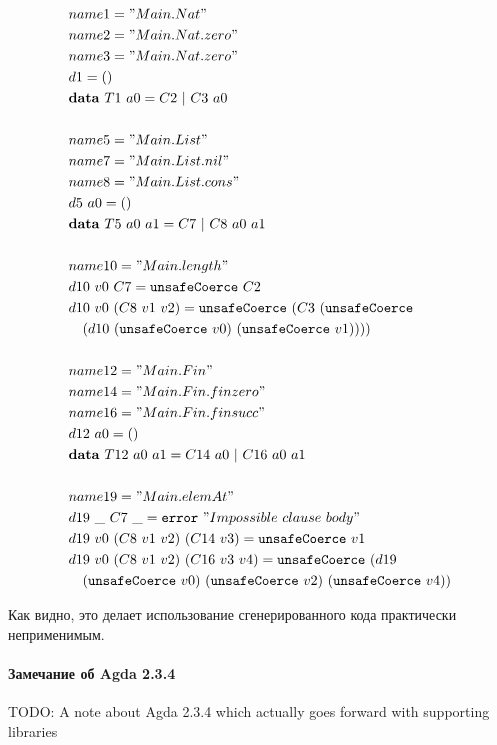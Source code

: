 \begin{align*}
&name1 = "Main.Nat"\\
&name2 = "Main.Nat.zero"\\
&name3 = "Main.Nat.zero"\\
&d1 = ()\\
&\mathbf{data}\ T1\ a0 = C2\ |\ C3\ a0\\
\\
&name5 = "Main.List"\\
&name7 = "Main.List.nil"\\
&name8 = "Main.List.cons"\\
&d5\ a0 = ()\\
&\mathbf{data}\ T5\ a0\ a1 = C7\ |\ C8\ a0\ a1\\
\\
&name10 = "Main.length"\\
&d10\ v0\ C7 = \texttt{unsafeCoerce}\ C2\\
&d10\ v0\ (C8\ v1\ v2) = \texttt{unsafeCoerce}\ (C3\ (\texttt{unsafeCoerce}\\
&\quad(d10\ (\texttt{unsafeCoerce}\ v0)\ (\texttt{unsafeCoerce}\ v1))))\\
\\
&name12 = "Main.Fin"\\
&name14 = "Main.Fin.finzero"\\
&name16 = "Main.Fin.finsucc"\\
&d12\ a0 = ()\\
&\mathbf{data}\ T12\ a0\ a1 = C14\ a0\ |\ C16\ a0\ a1\\
\\
&name19 = "Main.elemAt"\\
&d19\ \_\ C7\ \_ = \texttt{error}\ "Impossible\ clause\ body"\\
&d19\ v0\ (C8\ v1\ v2)\ (C14\ v3) = \texttt{unsafeCoerce}\ v1\\
&d19\ v0\ (C8\ v1\ v2)\ (C16\ v3\ v4) = \texttt{unsafeCoerce}\ (d19\\
&\quad(\texttt{unsafeCoerce}\ v0)\ (\texttt{unsafeCoerce}\ v2)\ (
   \texttt{unsafeCoerce}\ v4))
\end{align*}

Как видно, это делает использование сгенерированного кода
практически неприменимым.

\paragraph{Замечание об Agda 2.3.4}

TODO: A note about Agda 2.3.4 which actually goes forward with supporting libraries

